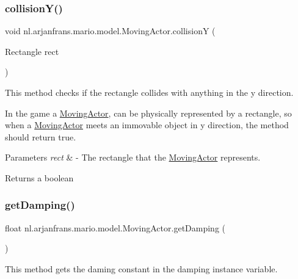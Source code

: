 \subsubsection{\texorpdfstring{collision\+Y()}{collisionY()}}
{\footnotesize\ttfamily void nl.\+arjanfrans.\+mario.\+model.\+Moving\+Actor.\+collisionY (\begin{DoxyParamCaption}\item[{Rectangle}]{rect }\end{DoxyParamCaption})\hspace{0.3cm}{\ttfamily [protected]}}



This method checks if the rectangle collides with anything in the y direction. 

In the game a \hyperlink{classnl_1_1arjanfrans_1_1mario_1_1model_1_1MovingActor}{Moving\+Actor}, can be physically represented by a rectangle, so when a \hyperlink{classnl_1_1arjanfrans_1_1mario_1_1model_1_1MovingActor}{Moving\+Actor} meets an immovable object in y direction, the method should return true. 
\begin{DoxyParams}{Parameters}
{\em rect} & -\/ The rectangle that the \hyperlink{classnl_1_1arjanfrans_1_1mario_1_1model_1_1MovingActor}{Moving\+Actor} represents. \\
\hline
\end{DoxyParams}
\begin{DoxyReturn}{Returns}
a boolean 
\end{DoxyReturn}
\mbox{\label{classnl_1_1arjanfrans_1_1mario_1_1model_1_1MovingActor_afad55ab6f56af85122985d51001e12fd}} 
\subsubsection{\texorpdfstring{get\+Damping()}{getDamping()}}
{\footnotesize\ttfamily float nl.\+arjanfrans.\+mario.\+model.\+Moving\+Actor.\+get\+Damping (\begin{DoxyParamCaption}{ }\end{DoxyParamCaption})}



This method gets the daming constant in the damping instance variable. 

